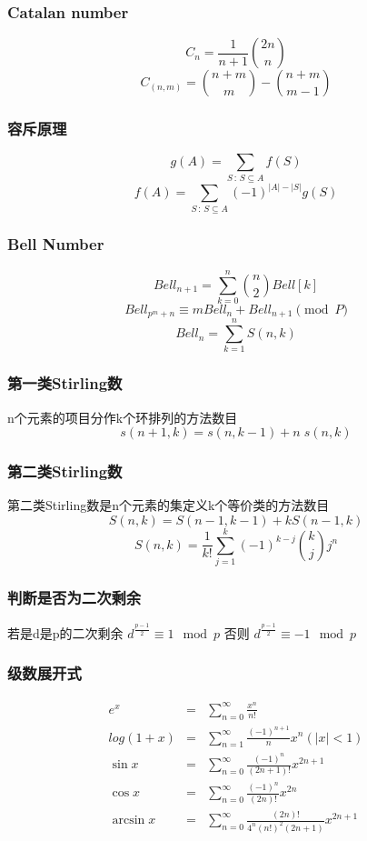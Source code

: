 \subsubsection{Catalan number}
\[ C_n = \frac{1}{n+1}{2n \choose n} \]
\[ C_{(n,m)} = {n+m \choose m} - {n+m \choose m-1} \]
\subsubsection{容斥原理}
\[ g(A)=\sum_{S\,:\,S\subseteq A}f(S) \]
\[ f(A)=\sum_{S\,:\,S\subseteq A}(-1)^{\left|A\right|-\left|S\right|}g(S) \]
\subsubsection{Bell Number}
\[Bell_{n+1} = \sum\limits_{k=0}^n {n\choose 2} Bell[k] \]
\[Bell_{p^m+n} \equiv mBell_{n} + Bell_{n+1} \pmod P\]
\[Bell_n = \sum\limits_{k=1}^{n} S(n,k) \]
\subsubsection{第一类Stirling数}
n个元素的项目分作k个环排列的方法数目
\[s(n+1,k)=s(n,k-1) + n \; s(n,k) \]
\subsubsection{第二类Stirling数}
第二类Stirling数是n个元素的集定义k个等价类的方法数目
\[S(n,k) = S(n-1,k-1) + k S(n-1,k)\]
\[S(n,k) =\frac{1}{k!}\sum_{j=1}^{k}(-1)^{k-j} {k\choose j} j^n \]
\subsubsection{判断是否为二次剩余}
若是d是p的二次剩余 $ d^{\frac{p-1}{2}} \equiv 1 \mod p $
否则 $ d^{\frac{p-1}{2}} \equiv -1 \mod p $
\subsubsection{级数展开式}
\begin{eqnarray*}
	e^x &=& \sum\limits_{n=0}^{\infty} \frac{x^n}{n!} \\
	log(1+x) &=& \sum\limits_{n=1}^{\infty} \frac{(-1)^{n+1}}{n}x^n (|x| < 1) \\
	\sin x &=& \sum\limits_{n=0}^{\infty} \frac{(-1)^n}{(2n+1)!}x^{2n+1} \\
	\cos x &=& \sum\limits_{n=0}^{\infty} \frac{(-1)^n}{(2n)!}x^{2n} \\
	\arcsin x &=& \sum\limits_{n=0}^{\infty} \frac{(2n)!}{4^n(n!)^2(2n+1)} x^{2n+1}
\end{eqnarray*} 
